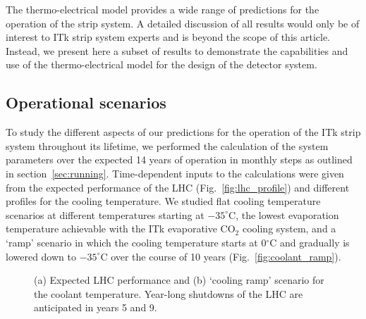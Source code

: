 
The thermo-electrical model provides a wide range of predictions for the operation of the strip system. A detailed discussion of all results would only be of interest to ITk strip system experts and is beyond the scope of this article. Instead, we present here a subset of results to demonstrate the capabilities and use of the thermo-electrical model for the design of the detector system.

\subsection{Operational scenarios}\label{sec:opscenarios}
To study the different aspects of our predictions for the operation of the ITk strip system throughout its lifetime, we performed the calculation of the system parameters over the expected 14 years of operation in monthly steps as outlined in section~\ref{sec:running}. Time-dependent inputs to the calculations were given from the expected performance of the LHC (Fig.~\ref{fig:lhc_profile}) and different profiles for the cooling temperature. We studied flat cooling temperature scenarios at different temperatures starting at $-35^\circ$C, the lowest evaporation temperature achievable with the ITk evaporative CO$_2$ cooling system, and a `ramp' scenario in which the cooling temperature starts at 0$^\circ$C and gradually is lowered down to $-35^\circ$C over the course of 10 years (Fig.~\ref{fig:coolant_ramp}).

\begin{figure}[ht]
\centering
{}\quad\quad
{}
\caption{(a) Expected LHC performance and (b) `cooling ramp' scenario for the coolant temperature. Year-long shutdowns of the LHC are anticipated in years 5 and 9.}
\label{fig:opscenarios}
\end{figure}

